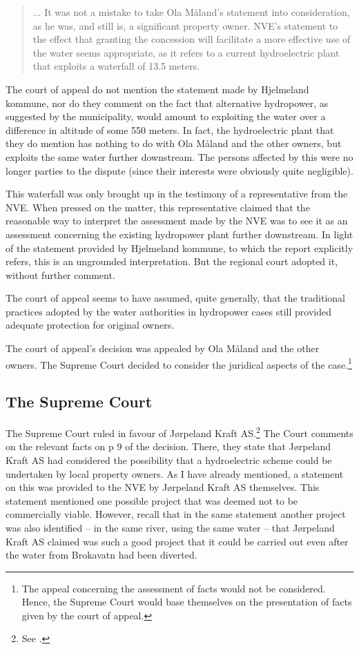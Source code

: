 \begin{quote}... It was not a mistake to take Ola Måland's statement into consideration, as he was, and still is, a significant property owner. NVE's statement to the effect that granting the concession will facilitate a more effective use of the water seems appropriate, as it refers to a current hydroelectric plant that exploits a waterfall of 13.5 meters.
\end{quote}

The court of appeal do not mention the statement made by Hjelmeland kommune, nor do they comment on the fact that alternative hydropower, as suggested by the municipality, would amount to exploiting the water over a difference in altitude of some 550 meters. In fact, the hydroelectric plant that they do mention has nothing to do with Ola Måland and the other owners, but exploits the same water further downstream. The persons affected by this were no longer parties to the dispute (since their interests were obviously quite negligible).

This waterfall was only brought up in the testimony of a representative from the NVE. When pressed on the matter, this representative claimed that the reasonable way to interpret the assessment made by the NVE was to see it as an assessment concerning the existing hydropower plant further downstream. In light of the statement provided by Hjelmeland kommune, to which the report explicitly refers, this is an ungrounded interpretation. But the regional court adopted it, without further comment.

The court of appeal seems to have assumed, quite generally, that the traditional practices adopted by the water authorities in hydropower cases still provided adequate protection for original owners.

The court of appeal's decision was appealed by Ola Måland and the other owners. The Supreme Court decided to consider the juridical aspects of the case.\footnote{The appeal concerning the assessment of facts would not be considered. Hence, the Supreme Court would base themselves on the presentation of facts given by the court of appeal.}

\subsection{The Supreme Court}

The Supreme Court ruled in favour of Jørpeland Kraft AS.\footnote{See \cite{jorpeland11}.} The Court comments on the relevant facts on p 9 of the decision. There, they state that Jørpeland Kraft AS had considered the possibility that a hydroelectric scheme could be undertaken by local property owners. As I have already mentioned, a statement on this was provided to the NVE by Jørpeland Kraft AS themselves. This statement mentioned one possible project that was deemed not to be commercially viable. However, recall that in the same statement another project was also identified -- in the same river, using the same water -- that Jørpeland Kraft AS claimed was such a good project that it could be carried out even after the water from Brokavatn had been diverted.

